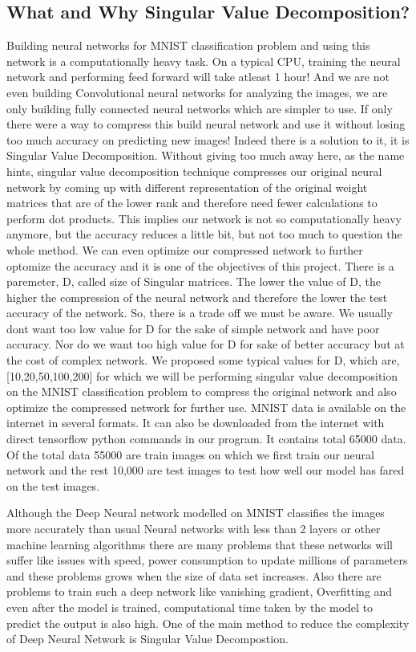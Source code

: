 \subsection{What and Why Singular Value Decomposition?}

Building neural networks for MNIST classification problem and using this
network is a computationally heavy task. On a typical CPU, training the neural
network and performing feed forward will take atleast 1 hour! And we are not
even building Convolutional neural networks for analyzing the images, we are
only building fully connected neural networks which are simpler to use. If
only there were a way to compress this build neural network and use it without
losing too much accuracy on predicting new images! Indeed there is a solution
to it, it is Singular Value Decomposition. Without giving too much away here,
as the name hints, singular value decomposition technique compresses our
original neural network by coming up with different representation of the
original weight matrices that are of the lower rank and therefore need fewer
calculations to perform dot products. This implies our network is not so
computationally heavy anymore, but the accuracy reduces a little bit, but not
too much to question the whole method. We can even optimize our compressed
network to further optomize the accuracy and it is one of the objectives of
this project. There is a paremeter, D, called size of Singular matrices. The
lower the value of D, the higher the compression of the neural network and
therefore the lower the test accuracy of the network. So, there is a trade off
we must be aware. We usually dont want too low value for D for the sake of
simple network and have poor accuracy. Nor do we want too high value for D for
sake of better accuracy but at the cost of complex network. We proposed some
typical values for D, which are, [10,20,50,100,200] for which we will be
performing singular value decomposition on the MNIST classification problem to
compress the original network and also optimize the compressed network for
further use. MNIST data is available on the internet in several formats. It
can also be downloaded from the internet with direct tensorflow python
commands in our program. It contains total 65000 data. Of the total data 55000
are train images on which we first train  our neural network and the rest
10,000 are test images to test how well our model has fared on the test
images.

Although the Deep Neural network modelled on MNIST classifies the images more
accurately than usual Neural networks with less than 2 layers or other machine
learning algorithms there are many problems that these networks will suffer like
issues with speed, power consumption to update millions of parameters and  these
problems grows when the size of data set increases. Also there are problems to
train such a deep network like vanishing gradient, Overfitting and even after
the model is trained, computational time taken by the model to predict the
output is also high. One of the main method to reduce the complexity of Deep
Neural Network is Singular Value Decompostion.

